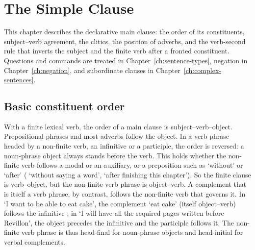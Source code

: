 \chapter{The Simple Clause}\label{ch:simple-clause}

This chapter describes the declarative main clause: the order of its constituents, subject--verb agreement, the clitics, the position of adverbs, and the verb-second rule that inverts the subject and the finite verb after a fronted constituent. Questions and commands are treated in Chapter~\ref{ch:sentence-types}, negation in Chapter~\ref{ch:negation}, and subordinate clauses in Chapter~\ref{ch:complex-sentences}.

\section{Basic constituent order}\label{sec:basic-order}
With a finite lexical verb, the order of a main clause is subject--verb--object. Prepositional phrases and most adverbs follow the object.
In a verb phrase headed by a non-finite verb, an infinitive or a participle, the order is reversed: a noun-phrase object always stands before the verb. This holds whether the non-finite verb follows a modal or an auxiliary, or a preposition such as  `without' or  `after' ( `without saying a word',  `after finishing this chapter'). So the finite clause is verb--object, but the non-finite verb phrase is object--verb.
A complement that is itself a verb phrase, by contrast, follows the non-finite verb that governs it. In  `I want to be able to eat cake', the complement  `eat cake' (itself object--verb) follows the infinitive ; in  `I will have all the required pages written before Revillon', the object  precedes the infinitive  and the participle  follows it. The non-finite verb phrase is thus head-final for noun-phrase objects and head-initial for verbal complements.

